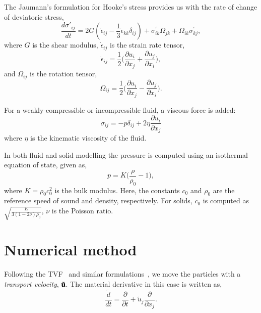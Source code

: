 The Jaumann's formulation for Hooke's stress provides us with the rate of
change of deviatoric stress,
\begin{equation}
  \label{eq:jaumann-stress-rate}
  \frac{d \sigma'_{ij}}{dt} = 2G (\dot{\epsilon}_{ij} - \frac{1}{3}
  \dot{\epsilon}_{kk} \delta_{ij}) + \sigma^{'}_{ik}  \Omega_{jk} +
  \Omega_{ik} \sigma^{'}_{kj},
\end{equation}
where $G$ is the shear modulus, $\dot{\epsilon}_{ij}$ is the strain rate tensor,
\begin{equation}
  \label{eq:strain-tensor}
  \dot{\epsilon}_{ij} = \frac{1}{2} \bigg(\frac{\partial u_i}{\partial x_j} +
  \frac{\partial u_j}{\partial x_i} \bigg),
\end{equation}
and $\Omega_{ij}$ is the rotation tensor,
\begin{equation}
  \label{eq:rotational-tensor}
  \Omega_{ij} = \frac{1}{2} \bigg(\frac{\partial u_i}{\partial x_j} -
  \frac{\partial u_j}{\partial x_i} \bigg).
\end{equation}

For a weakly-compressible or incompressible fluid, a viscous force is added:
\begin{equation}
  \label{eq:fluid-stress-decomposition}
  \sigma_{ij} = - p \delta_{ij} + 2 \eta \frac{\partial u_i}{\partial x_j}
\end{equation}
where $\eta$ is the kinematic viscosity of the fluid.

In both fluid and solid modelling the pressure is computed using an
isothermal equation of state, given as,
\begin{equation}
  \label{eq:pressure-equation}
  p = K \bigg(\frac{\rho}{\rho_{0}} - 1 \bigg),
\end{equation}
where $K = \rho_{0} c_0^2$ is the bulk modulus. Here, the constants $c_0$ and
$\rho_0$ are the reference speed of sound and density, respectively. For solids,
$c_0$ is computed as $\sqrt{\frac{E}{3 (1 - 2 \nu)\rho_{0}}}$, $\nu$ is the
Poisson ratio.


\section{Numerical method}


Following the TVF~\citep{Adami2013} and similar
formulations~\citep{oger_ale_sph_2016}, we move the particles with a
\emph{transport velocity}, $\tilde{\mathbf{u}}$. The material derivative in this
case is written as,
\begin{equation}
  \label{eq:modified-material-derivative}
  \frac{\tilde{d} }{d t} = \frac{\partial }{\partial t} +
  \tilde{u}_j \frac{\partial }{\partial x_j}.
\end{equation}


